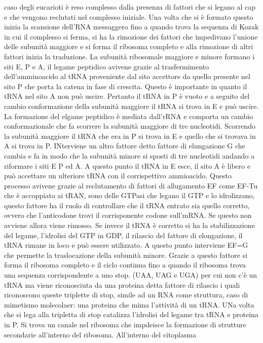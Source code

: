 caso degli eucarioti \`e reso complesso dalla presenza di fattori che si legano al cap e che vengono reclutati nel complesso iniziale. Una volta che si \`e formato questo inizia la 
scansione dell'RNA messaggero fino a quando trova la sequenza di Kozak in cui il complesso si ferma, si ha la rimozione dei fattori che impedivano l'unione delle subunit\`a maggiore e 
si forma il ribosoma completo e alla rimozione di altri fattori inizia la traduzione. La subunit\`a ribosomale maggiore e minore formano i siti E, P e A, il legame peptidico avivene
grazie al trasfermimento dell'amminoacido al tRNA proveniente dal sito accettore da quello presente nel sito P che porta la catena in fase di crescita. Questo \`e importante in quanto
il tRNA nel sito A non pu\`o uscire. Pertanto il tRNA in P \`e vuoto e a seguito del cambio conformazione della subunit\`a maggiore il tRNA si trova in E e pu\`o uscire. La
formazione del elgame peptidico \`e mediata dall'rRNA e comporta un cambio conformazionale che fa scorrere la subunit\`a maggiore di tre nucleotidi. Scorrendo la subunit\`a maggiore il 
tRNA che era in P si trova in E e quello che si trovava in A si trova in P. INterviene un altro fattore detto fattore di elungazione G che cambia e fa in modo che la subunit\`a minore
si sposti di tre nucleotidi andando a riformare i siti E P ed A. A questo punto il tRNA in E esce, il sito A \`e libero e pu\`o accettare un ulteriore tRNA con il corrispettivo 
ammioacido. Questo processo avivene grazie al reclutamento di fattori di allugamento EF come EF-Tu che \`e accoppiato ai tRAN, sono delle GTPasi che legano il GTP e lo idrolizzano, questo
fattore ha il ruolo di controllare che il tRNA entrato sia quello corretto, ovvero che l'anticodone trovi il corrisponente codone sull'mRNA. Se questo non avviene allora viene rimosso. 
Se invece il tRNA \`e corretto si ha la stabilizzazione del legame, l'idrolisi del GTP in GDP, il rilascio del fattore di elongazione, il tRNA rimane in loco e pu\`o essere utilizzato. 
A questo punto interviene EF=G che permette la traslocazione della subunit\`a minore. Grazie a questo fattore si forma il ribosoma completo e il ciclo continua fino a quando il ribosoma
trova una sequenza corrispondente a uno stop. (UAA, UAG e UGA) per cui non c'\`e un tRNA ma viene riconosciuta da una proteina detta fattore di rilascio i quali riconoscono queste 
triplette di stop, simile ad un RNA come struttura, caso di mimetismo molecolaer: una proteina che mima l'attivit\`a di un tRNA. UNa volta che si lega alla tripletta di stop catalizza 
l'idrolisi del legame tra tRNA e proteina in P. Si trova un canale nel ribosoma che impdeisce la formazione di strutture secondarie all'interno del ribosoma. All'interno del citoplasma
